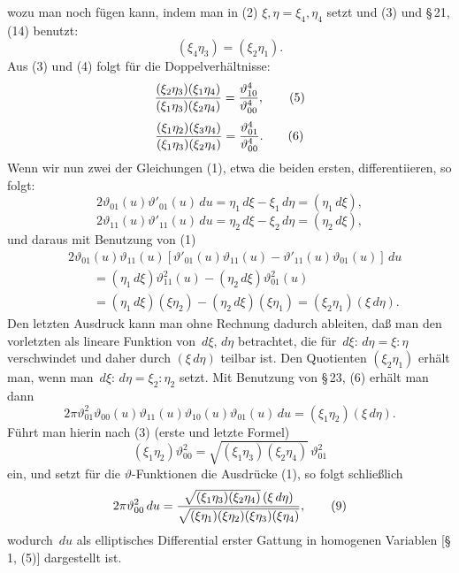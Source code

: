 \documentclass[11pt]{article}
\providecommand{\dd}{\,d}
\providecommand{\tht}{\vartheta}
\begin{document}
wozu man noch fügen kann, indem man in (2) $\xi,\eta=\xi_4,\eta_4$ setzt und (3) und \S\,21, (14) benutzt:
\begin{equation}
(\xi_4\eta_3)=(\xi_2\eta_1).
\tag{4}
\end{equation}
Aus (3) und (4) folgt für die Doppelverhältnisse:
\begin{equation}
\frac{(\xi_2\eta_3)(\xi_1\eta_4)}{(\xi_1\eta_3)(\xi_2\eta_4)}={\tht_{10}^{4}\over\tht_{00}^{4}},
\tag{5}
\end{equation}
\begin{equation}
\frac{(\xi_1\eta_2)(\xi_3\eta_4)}{(\xi_1\eta_3)(\xi_2\eta_4)}={\tht_{01}^{4}\over\tht_{00}^{4}}.
\tag{6}
\end{equation}
Wenn wir nun zwei der Gleichungen (1), etwa die beiden ersten, differentiieren, so folgt:
\[
2\tht_{01}(u)\tht'_{01}(u)\dd u=\eta_1\dd\xi-\xi_1\dd\eta=(\eta_1\dd\xi),
\]
\[
2\tht_{11}(u)\tht'_{11}(u)\dd u=\eta_2\dd\xi-\xi_2\dd\eta=(\eta_2\dd\xi),
\]
und daraus mit Benutzung von (1)
\begin{align*}
&2\tht_{01}(u)\tht_{11}(u)
\left[\tht'_{01}(u)\tht_{11}(u)-\tht'_{11}(u)\tht_{01}(u)\right]\dd u\\
&\qquad=(\eta_1\dd\xi)\tht_{11}^{2}(u)-(\eta_2\dd\xi)\tht_{01}^{2}(u)\\
&\qquad=(\eta_1\dd\xi)(\xi\eta_2)-(\eta_2\dd\xi)(\xi\eta_1)=(\xi_2\eta_1)(\xi\dd\eta).
\end{align*}
Den letzten Ausdruck kann man ohne Rechnung dadurch ableiten, daß man den vorletzten als lineare Funktion von $\dd\xi,\dd\eta$ betrachtet, die für $\dd\xi:\dd\eta=\xi:\eta$ verschwindet und daher durch $(\xi\dd\eta)$ teilbar ist. Den Quotienten $(\xi_2\eta_1)$ erhält man, wenn man $\dd\xi:\dd\eta=\xi_2:\eta_2$ setzt. Mit Benutzung von \S\,23, (6) erhält man dann
\begin{equation}
2\pi\tht_{01}^{2}\tht_{00}(u)\tht_{11}(u)\tht_{10}(u)\tht_{01}(u)\dd u=(\xi_1\eta_2)(\xi\dd\eta).
\tag{7}
\end{equation}
Führt man hierin nach (3) (erste und letzte Formel)
\begin{equation}
(\xi_1\eta_2)\tht_{00}^{2}=\sqrt{(\xi_1\eta_3)(\xi_2\eta_4)}\,\tht_{01}^{2}
\tag{8}
\end{equation}
ein, und setzt für die $\vartheta$-Funktionen die Ausdrücke (1), so folgt schließlich
\begin{equation}
2\pi\tht_{00}^{2}\dd u=
{\sqrt{(\xi_1\eta_3)(\xi_2\eta_4)}\,(\xi\dd\eta)
\over
\sqrt{(\xi\eta_1)(\xi\eta_2)(\xi\eta_3)(\xi\eta_4)}} ,
\tag{9}
\end{equation}
wodurch $\dd u$ als elliptisches Differential erster Gattung in homogenen Variablen [\S\,1, (5)] dargestellt ist.
\end{document}
